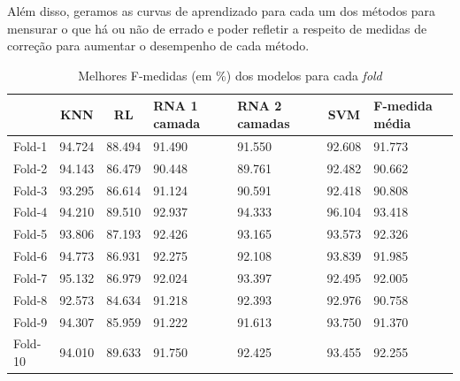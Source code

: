 \documentclass[10pt, conference, compsocconf]{IEEEtran}
\begin{document}
Além disso, geramos as curvas de aprendizado para cada um dos métodos para
mensurar o que há ou não de errado e poder refletir a respeito de medidas de
correção para aumentar o desempenho de cada método. 

\begin{table}[!t]
\renewcommand{\arraystretch}{1.3}
\caption{Melhores F-medidas (em \%) dos modelos para cada \textit{fold}}
\label{fmedidas}
\centering
    \begin{tabular}{|l|c|c|p{0.9cm}|p{0.9cm}|c|p{0.8cm}|}
    \hline
    & KNN & RL & RNA 1 camada & RNA 2
    camadas & SVM & F-medida média\\
    \hline
    Fold-1 & 94.724 & 88.494 & 91.490 & 91.550 & 92.608 & 91.773 \\ 
    Fold-2 & 94.143 & 86.479 & 90.448 & 89.761 & 92.482 & 90.662 \\
    Fold-3 & 93.295 & 86.614 & 91.124 & 90.591 & 92.418 & 90.808 \\ 
    Fold-4 & 94.210 & 89.510 & 92.937 & 94.333 & 96.104 & 93.418 \\ 
    Fold-5 & 93.806 & 87.193 & 92.426 & 93.165 & 93.573 & 92.326 \\ 
    Fold-6 & 94.773 & 86.931 & 92.275 & 92.108 & 93.839 & 91.985 \\ 
    Fold-7 & 95.132 & 86.979 & 92.024 & 93.397 & 92.495 & 92.005 \\ 
    Fold-8 & 92.573 & 84.634 & 91.218 & 92.393 & 92.976 & 90.758 \\ 
    Fold-9 & 94.307 & 85.959 & 91.222 & 91.613 & 93.750 & 91.370 \\ 
    Fold-10 & 94.010 & 89.633 & 91.750 & 92.425 & 93.455 & 92.255 \\
    \hline
    \end{tabular}
\end{table}
\end{document}
